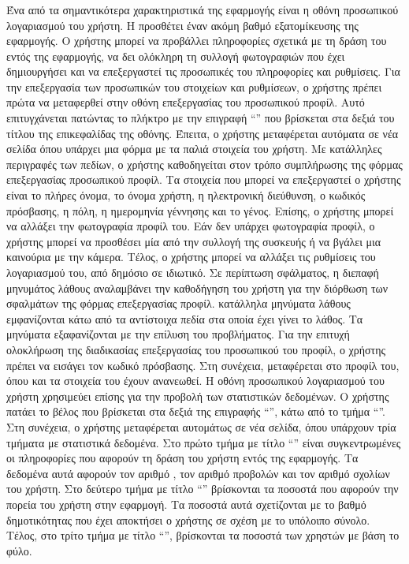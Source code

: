 \subsubsection{}
Ένα από τα σημαντικότερα χαρακτηριστικά της εφαρμογής είναι η οθόνη προσωπικού λογαριασμού του χρήστη. Η  προσθέτει έναν ακόμη βαθμό εξατομίκευσης της εφαρμογής. Ο χρήστης μπορεί να προβάλλει πληροφορίες σχετικά με τη δράση του εντός της εφαρμογής, να δει ολόκληρη τη συλλογή φωτογραφιών που έχει δημιουργήσει και να επεξεργαστεί τις προσωπικές του πληροφορίες και ρυθμίσεις. 
\newline
\indent
Για την επεξεργασία των προσωπικών του στοιχείων και ρυθμίσεων, ο χρήστης πρέπει πρώτα να μεταφερθεί στην οθόνη επεξεργασίας του προσωπικού προφίλ. Αυτό επιτυγχάνεται πατώντας το πλήκτρο με την επιγραφή ``'' που βρίσκεται στα δεξιά του τίτλου της επικεφαλίδας της οθόνης. Έπειτα, ο χρήστης μεταφέρεται αυτόματα σε νέα σελίδα όπου υπάρχει μια φόρμα με τα παλιά στοιχεία του χρήστη. Με κατάλληλες περιγραφές των πεδίων, ο χρήστης καθοδηγείται στον τρόπο συμπλήρωσης της φόρμας επεξεργασίας προσωπικού προφίλ. Τα στοιχεία που μπορεί να επεξεργαστεί ο χρήστης είναι το πλήρες όνομα, το όνομα χρήστη, η ηλεκτρονική διεύθυνση, ο κωδικός πρόσβασης, η πόλη, η ημερομηνία γέννησης και το γένος. Επίσης, ο χρήστης μπορεί να αλλάξει την φωτογραφία προφίλ του. Εάν δεν υπάρχει φωτογραφία προφίλ, ο χρήστης μπορεί να προσθέσει μία από την συλλογή της συσκευής ή να βγάλει μια καινούρια με την κάμερα. Τέλος, ο χρήστης μπορεί να αλλάξει τις ρυθμίσεις του λογαριασμού του, από δημόσιο σε ιδιωτικό.
\newline
\indent
Σε περίπτωση σφάλματος, η διεπαφή μηνυμάτος λάθους αναλαμβάνει την καθοδήγηση του χρήστη για την διόρθωση των σφαλμάτων της φόρμας επεξεργασίας προφίλ. κατάλληλα μηνύματα λάθους εμφανίζονται κάτω από τα αντίστοιχα πεδία στα οποία έχει γίνει το λάθος. Τα μηνύματα εξαφανίζονται με την επίλυση του προβλήματος. Για την επιτυχή ολοκλήρωση της διαδικασίας επεξεργασίας του προσωπικού του προφίλ, ο χρήστης πρέπει να εισάγει τον κωδικό πρόσβασης. Στη συνέχεια, μεταφέρεται στο προφίλ του, όπου και τα στοιχεία του έχουν ανανεωθεί.
\newline
\indent
Η οθόνη προσωπικού λογαριασμού του χρήστη χρησιμεύει επίσης για την προβολή των στατιστικών δεδομένων. Ο χρήστης πατάει το βέλος που βρίσκεται στα δεξιά της επιγραφής ``'', κάτω από το τμήμα ``''. Στη συνέχεια, ο χρήστης μεταφέρεται αυτομάτως σε νέα σελίδα, όπου υπάρχουν τρία τμήματα με στατιστικά δεδομένα. Στο πρώτο τμήμα με τίτλο ``'' είναι συγκεντρωμένες οι πληροφορίες που αφορούν τη δράση του χρήστη εντός της εφαρμογής. Τα δεδομένα αυτά αφορούν τον αριθμό , τον αριθμό προβολών και τον αριθμό σχολίων του χρήστη. Στο δεύτερο τμήμα με τίτλο ``'' βρίσκονται τα ποσοστά που αφορούν την πορεία του χρήστη στην εφαρμογή. Τα ποσοστά αυτά σχετίζονται με το βαθμό δημοτικότητας που έχει αποκτήσει ο χρήστης σε σχέση με το υπόλοιπο σύνολο. Τέλος, στο τρίτο τμήμα με τίτλο ``'', βρίσκονται τα ποσοστά των χρηστών με βάση το φύλο. 

